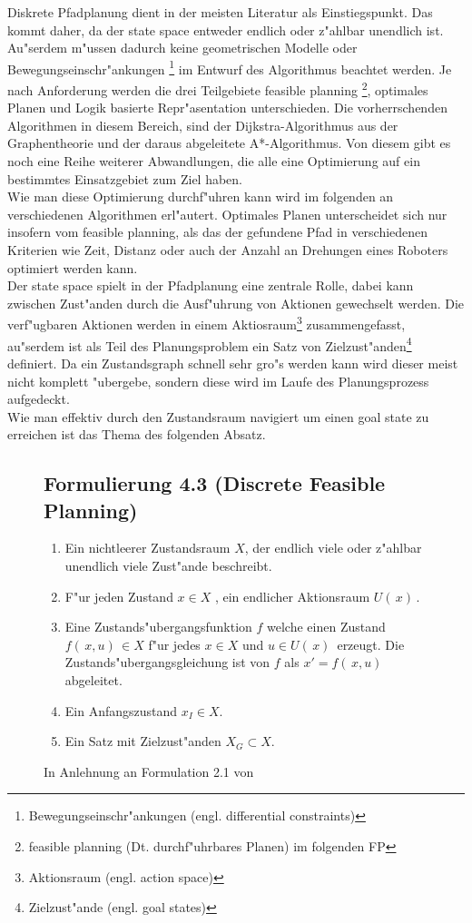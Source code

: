 Diskrete Pfadplanung dient in der meisten Literatur als Einstiegspunkt. Das kommt daher, da der state space entweder endlich oder z"ahlbar unendlich ist.\\
Au"serdem m"ussen dadurch keine geometrischen Modelle oder Bewegungseinschr"ankungen \footnote{Bewegungseinschr"ankungen (engl. differential constraints)} im Entwurf des Algorithmus beachtet werden.
Je nach Anforderung werden die drei Teilgebiete feasible planning \footnote{feasible planning (Dt. durchf"uhrbares Planen) im folgenden FP}, optimales Planen und Logik basierte Repr"asentation unterschieden. Die vorherrschenden Algorithmen in diesem Bereich, sind der Dijkstra-Algorithmus aus der Graphentheorie und der daraus abgeleitete A*-Algorithmus. Von diesem gibt es noch eine Reihe weiterer Abwandlungen, die alle eine Optimierung auf ein bestimmtes Einsatzgebiet zum Ziel haben.\cite[~S. 27]{Lav06} \\
Wie man diese Optimierung durchf"uhren kann wird im folgenden an verschiedenen Algorithmen erl"autert. Optimales Planen unterscheidet sich nur insofern vom feasible planning, als das der gefundene Pfad in verschiedenen Kriterien wie Zeit, Distanz oder auch der Anzahl an Drehungen eines Roboters optimiert werden kann.\cite[~S. 43]{Lav06} \\
Der state space spielt in der Pfadplanung eine zentrale Rolle, dabei kann zwischen Zust"anden durch die Ausf"uhrung von Aktionen gewechselt werden. Die verf"ugbaren Aktionen werden in einem Aktiosraum\footnote{Aktionsraum (engl. action space) } zusammengefasst, au"serdem ist als Teil des Planungsproblem ein Satz von Zielzust"anden\footnote{Zielzust"ande (engl. goal states)} definiert. 
Da ein Zustandsgraph schnell sehr gro"s werden kann wird dieser meist nicht komplett "ubergebe, sondern diese wird im Laufe des Planungsprozess aufgedeckt.
\cite[~S. 43]{Lav06} \\
Wie man effektiv durch den Zustandsraum navigiert um einen goal state zu erreichen ist das Thema des folgenden Absatz.
\begin{figure}
\centering
\subsection*{Formulierung 4.3 (Discrete Feasible Planning)}
\begin{enumerate}
	\item Ein nichtleerer Zustandsraum $X$, der endlich viele oder z"ahlbar unendlich viele Zust"ande beschreibt.  
	\item F"ur jeden Zustand $x \in X$ , ein endlicher Aktionsraum $U( \, x) \,$.
	\item Eine Zustands"ubergangsfunktion $f$ welche einen Zustand  $f( \, x,u) \, \in X$ f"ur jedes $x \in X$  und $u \in U( \, x) \,$ erzeugt. Die Zustands"ubergangsgleichung ist von $f$ als $x' = f( \, x,u )\, $ abgeleitet.
	\item Ein Anfangszustand $ x_{I} \in X$.
	\item Ein Satz mit Zielzust"anden $X_{G} \subset X$.
\end{enumerate}
\caption{In Anlehnung an Formulation 2.1 von \cite[~S. 29]{Lav06}}
\label{lav03}
\end{figure}
